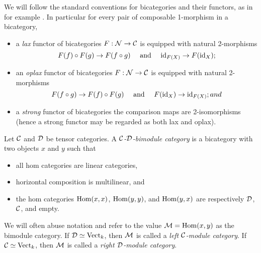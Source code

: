 \documentclass{amsart}
\begin{document}
We will follow the standard conventions for bicategories and their functors, as in for example \cite{MR2664622}. In particular for every pair of composable 1-morphism in a bicategory, 
\begin{itemize}
	\item a {\em lax} functor of bicategories $F: \mathcal N \to \mathcal C$ is equipped with natural 2-morphisms
	\begin{equation*}
		F(f) \circ F(g) \to F(f \circ g) \quad \textrm{ and } \quad \mathrm{id}_{F(X)} \to F(\mathrm{id}_X);
	\end{equation*} 
	\item an {\em oplax} functor of bicategories $F: \mathcal N \to \mathcal C$ is equipped with natural 2-morphisms
	\begin{equation*}
		F(f \circ g) \to F(f) \circ F(g)   \quad \textrm{ and } \quad F(\mathrm{id}_X) \to \mathrm{id}_{F(X)}; and
	\end{equation*}
	\item a {\em strong} functor of bicategories the comparison maps are 2-isomorphisms (hence a strong functor may be regarded as both lax and oplax). 
\end{itemize}

\begin{definition}
	Let $\mathcal C$ and $\mathcal D$ be tensor categories. A {\em $\mathcal C$-$\mathcal D$-bimodule category} is a bicategory with two objects $x$ and $y$ such that
	\begin{itemize}
		\item all hom categories are linear categories, 
		\item horizontal composition is multilinear, and
		\item the hom categories $\operatorname{Hom}(x,x)$, $\operatorname{Hom}(y,y)$, and $\operatorname{Hom}(y,x)$ are respectively $\mathcal D$, $\mathcal C$, and empty.
	\end{itemize}
	We will often abuse notation and refer to the value $\mathcal M = \operatorname{Hom}(x,y)$ as the bimodule category. If $\mathcal D \simeq \mathrm{Vect}_k$, then $\mathcal M$ is called a {\em left $\mathcal C$-module category}. If $\mathcal C \simeq \mathrm{Vect}_k$, then $\mathcal M$ is called a {\em right $\mathcal D$-module category}.
\end{definition}
	
\end{document}
